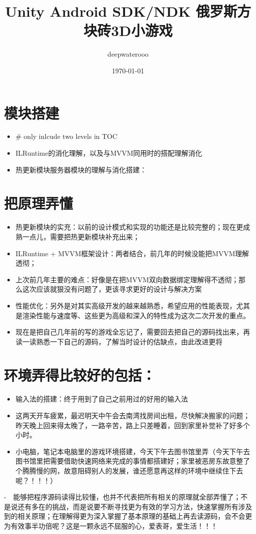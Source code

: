\documentclass[9pt, b5paper]{article}
\author{deepwaterooo}
\date{\today}
\title{Unity Android SDK/NDK 俄罗斯方块砖3D小游戏}
\begin{document}
\maketitle
\tableofcontents


\section{模块搭建}
\label{sec-1}
\begin{itemize}
\item \# only inlcude two levels in TOC
\item ILRuntime的消化理解，以及与MVVM同用时的搭配理解消化
\item 热更新模块服务器模块的理解与消化搭建：
\end{itemize}

\section{把原理弄懂}
\label{sec-2}
\begin{itemize}
\item 热更新模块的实充：以前的设计模式和实现的功能还是比较完整的；现在更成熟一点儿，需要把热更新模块补充出来；
\item ILRuntime + MVVM框架设计：两者结合，前几年的时候没能把MVVM理解透彻；
\item 上次前几年主要的难点：好像是在把MVVM双向数据绑定理解得不透彻；那么这次应该就狠没有问题了，更该寻求更好的设计与解决方案
\item 性能优化：另外是对其实高级开发的越来越熟悉，希望应用的性能表现，尤其是渲染性能与速度等、这些更为高级和深入的特性成为这次二次开发的重点。

\item 现在是把自己几年前的写的游戏全忘记了，需要回去把自己的源码找出来，再读一读熟悉一下自己的源码，了解当时设计的估缺点，由此改进更将
\end{itemize}

\section{环境弄得比较好的包括：}
\label{sec-3}
\begin{itemize}
\item 输入法的搭建：终于用到了自己之前用过的好用的输入法
\item 这两天开车疲累，最迟明天中午会去南湾找房间出租，尽快解决搬家的问题；昨天晚上回来得太晚了，一路辛苦，路上只差睡着，回到家里补觉补了好多个小时。
\item 小电脑，笔记本电脑里的游戏环境搭建，今天下午去图书馆里弄（今天下午去图书馆里把需要借助快速网络来完成的事情都搭建好；家里被恶房东故意整了个腾腾慢的网，故意阻碍别人的发展，谁还愿意再这样的环境中继续住下去呢？！！！）
\end{itemize}
-　能够把程序源码读得比较懂，也并不代表把所有相关的原理就全部弄懂了；不是说还有多在的挑战，而是说要不断寻找更为有效的学习方法，快速掌握所有涉及到的相关原理；在理解得更为深入掌握了基本原理的基础上再去读源码，会不会更为有效事半功倍呢？这是一颗永远不屈服的心，爱表哥，爱生活！！！
\end{document}
